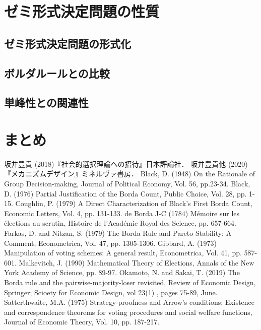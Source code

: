 \documentclass[dvipdfmx]{jsarticle}
\begin{document}
\section{ゼミ形式決定問題の性質}

\subsection{ゼミ形式決定問題の形式化}
\subsection{ボルダルールとの比較}
\subsection{単峰性との関連性}

\section{まとめ}

\begin{thebibliography}{9}
  坂井豊貴 (2018)『社会的選択理論への招待』日本評論社．
  坂井豊貴他 (2020)『メカニズムデザイン』ミネルヴァ書房．
  Black, D. (1948) On the Rationale of Group Decision-making, Journal of Political Economy,
  Vol. 56, pp.23-34.
  Black, D. (1976) Partial Justification of the Borda Count, Public Choice,
  Vol. 28, pp. 1-15.
  Coughlin, P. (1979) A Direct Characterization of Black's First Borda Count,
  Economic Letters, Vol. 4, pp. 131-133.
  de Borda J-C (1784) M\'{e}moire sur les \'{e}lections au scrutin, Histoire de l'Acad\'{e}mie
  Royal des Science, pp. 657-664.
  Farkas, D. and Nitzan, S. (1979) The Borda Rule and Pareto Stability: A Comment,
  Econometrica, Vol. 47, pp. 1305-1306.
  Gibbard, A. (1973) Manipulation of voting schemes: A general result, Econometrica, Vol. 41,
  pp. 587-601.
    Malkevitch, J. (1990) Mathematical Theory of Elections, Annals of the New York
    Academy of Science, pp. 89-97.
  Okamoto, N. and Sakai, T. (2019) The Borda rule and the pairwise-majority-loser
  revisited, Review of Economic Design, Springer; Scioety for Economic Design, vol 23(1)
  , pages 75-89, June.
  Satterthwaite, M.A. (1975) Strategy-proofness and Arrow's conditions:
  Existence and correspondence theorems for voting procedures and social
  welfare functions, Journal of Economic Theory, Vol. 10, pp. 187-217.
\end{thebibliography}
\end{document}
